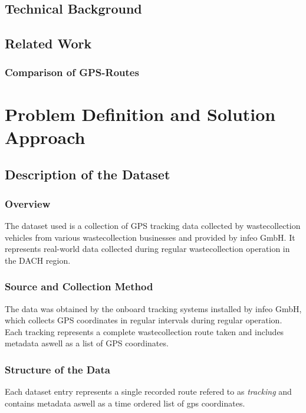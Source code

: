 \documentclass[a4paper,12pt,twoside]{scrreprt}
\begin{document}
\section{Technical Background}

\section{Related Work}

\subsection{Comparison of GPS-Routes}

\chapter{Problem Definition and Solution Approach}

\section{Description of the Dataset}

\subsection{Overview}
The dataset used is a collection of GPS tracking data collected by
wastecollection vehicles from various wastecollection businesses and provided
by infeo GmbH. It represents real-world data
collected during regular wastecollection operation in the DACH region.

\subsection{Source and Collection Method}
The data was obtained by the onboard tracking systems installed by infeo GmbH,
which collects GPS coordinates in regular intervals during regular operation.
Each tracking represents a complete wastecollection route taken and includes
metadata aswell as a list of GPS coordinates.

\subsection{Structure of the Data}
Each dataset entry represents a single recorded route refered to as
\textit{tracking} and contains metadata aswell as a time ordered list of gps
coordinates.
\end{document}

